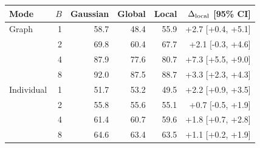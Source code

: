 \begin{tabular}{lrrrrr}
\toprule
Mode & $B$ & Gaussian & Global & Local & $\Delta_{\rm local}$ [95\% CI] \\
\midrule
Graph & 1 & 58.7 & 48.4 & 55.9 & +2.7 [+0.4, +5.1] \\
 & 2 & 69.8 & 60.4 & 67.7 & +2.1 [-0.3, +4.6] \\
 & 4 & 87.9 & 77.6 & 80.7 & +7.3 [+5.5, +9.0] \\
 & 8 & 92.0 & 87.5 & 88.7 & +3.3 [+2.3, +4.3] \\
\midrule
Individual & 1 & 51.7 & 53.2 & 49.5 & +2.2 [+0.9, +3.5] \\
 & 2 & 55.8 & 55.6 & 55.1 & +0.7 [-0.5, +1.9] \\
 & 4 & 61.4 & 60.7 & 59.6 & +1.8 [+0.7, +2.8] \\
 & 8 & 64.6 & 63.4 & 63.5 & +1.1 [+0.2, +1.9] \\
\bottomrule
\end{tabular}
